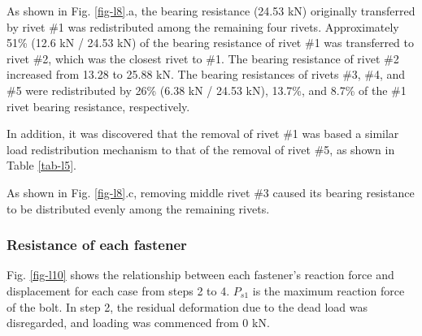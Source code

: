 As shown in Fig. \ref{fig-l8}.a, the bearing resistance (24.53 kN) originally transferred by rivet \#1 was redistributed among the remaining four rivets. Approximately 51\% (12.6 kN / 24.53 kN) of the bearing resistance of rivet \#1 was transferred to rivet \#2, which was the closest rivet to \#1. The bearing resistance of rivet \#2 increased from 13.28 to 25.88 kN. The bearing resistances of rivets \#3, \#4, and \#5 were redistributed by 26\% (6.38 kN / 24.53 kN), 13.7\%, and 8.7\% of the \#1 rivet bearing resistance, respectively.

In addition, it was discovered that the removal of rivet \#1 was based a similar load redistribution mechanism to that of the removal of rivet \#5, as shown in Table \ref{tab-l5}.

As shown in Fig. \ref{fig-l8}.c, removing middle rivet \#3 caused its bearing resistance to be distributed evenly among the remaining rivets.

\subsubsection{Resistance of each fastener}

Fig. \ref{fig-l10} shows the relationship between each fastener’s reaction force and displacement for each case from steps 2 to 4. $P_{s1}$ is the maximum reaction force of the bolt. In step 2, the residual deformation due to the dead load was disregarded, and loading was commenced from 0 kN.

